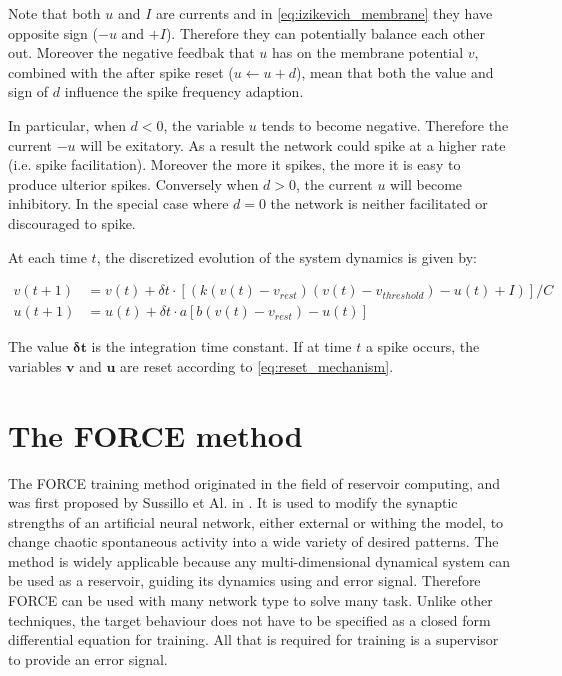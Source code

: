 \documentclass[10pt,a4paper, final]{report} %
\begin{document}
Note that both $u$ and $I$ are currents and in \eqref{eq:izikevich_membrane} they have opposite sign ($-u$ and $+I$). Therefore they can potentially balance each other out. Moreover the negative feedbak that $u$ has on the membrane potential $v$, combined with the after spike reset ($u \leftarrow u + d$), mean that both the value and sign of $d$ influence the spike frequency adaption. 

In particular, when $d < 0$, the variable $u$ tends to become negative. Therefore the current $-u$ will be exitatory. As a result the network could spike at a higher rate (i.e. spike facilitation). Moreover the more it spikes, the more it is easy to produce ulterior spikes. Conversely when $d > 0$, the current $u$ will become inhibitory. In the special case where $d = 0$ the network is neither facilitated or discouraged to spike.

At each time $t$, the discretized evolution of the system dynamics is given by:

\begin{align}
v(t+1) &= v(t) + \delta t \cdot [( k(v(t) - v_{rest}) (v(t) - v_{threshold}) - u(t) + I)]/C\\
u(t+1) &= u(t) + \delta t \cdot a[b(v(t) - v_{rest}) - u(t)]
\end{align}

The value $\bm{\delta t}$ is the integration time constant. If at time $t$ a spike occurs, the variables $\bm{v}$ and $\bm{u}$ are reset according to \eqref{eq:reset_mechanism}.

\section{The FORCE method}
\label{sec:FORCE_method}
The FORCE training method originated in the field of reservoir computing, and was first proposed by Sussillo et Al. in \cite{sussillo2009generating}.
It is used to modify the synaptic strengths of an artificial neural network, either external or withing the model, to change chaotic spontaneous activity into a wide variety of desired patterns.
The method is widely applicable because any multi-dimensional dynamical system can be used as a reservoir, guiding its dynamics using and error signal. Therefore FORCE can be used with many network type to solve many task. Unlike other techniques, the target behaviour does not have to be specified as a closed form differential equation for training. All that is required for training is a supervisor to provide an error signal.
\end{document}
